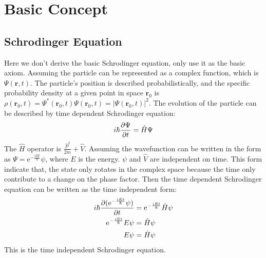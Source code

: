 \documentclass[../main.tex]{subfiles}
\begin{document}
\section{\textbf{Basic Concept}}

\subsection{Schrodinger Equation}
Here we don't derive the basic Schrodinger equation, only use it as the basic axiom. Assuming the particle can be represented as a complex function, which is $\Psi(\bm{r}, t)$. The particle's position is described probabilistically, and the specific probability density at a given point in space $\bm{r}_0$ is $\rho(\bm{r}_0, t) = \Psi^*(\bm{r}_0, t) \Psi(\bm{r}_0, t) = |\Psi(\bm{r}_0, t)|^2$. The evolution of the particle can be described by time dependent Schrodinger equation:
\begin{equation}
    i\hbar \pdv{\Psi}{t} = \hat{H} \Psi
\end{equation}
The $\hat{H}$ operator is $\frac{\hat{P}^2}{2m} + \hat{V}$. Assuming the wavefunction can be written in the form as $\Psi = \textrm{e}^{-\frac{i E t}{\hbar}}\psi$, where $E$ is the energy. $\psi$ and $\hat{V}$ are independent on time. This form indicate that, the state only rotates in the complex space because the time only contribute to a change on the phase factor. Then the time dependent Schrodinger equation can be written as the time independent form:
\begin{align}
    i\hbar \pdv{(\textrm{e}^{-\frac{i E t}{\hbar}}\psi)}{t} &= \textrm{e}^{-\frac{i E t}{\hbar}} \hat{H}\psi\nonumber\\
    \textrm{e}^{-\frac{i E t}{\hbar}} E\psi &= \hat{H}\psi\nonumber\\
    E\psi &= \hat{H}\psi
\end{align}
This is the time independent Schrodinger equation.
\end{document}
